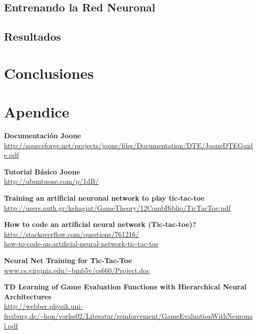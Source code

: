 \documentclass[12pt,titlepage]{article}
\begin{document}
\subsection{Entrenando la Red Neuronal}

\subsection{Resultados}

\section{Conclusiones}


\appendix
\section{Apendice}



\begin{thebibliography}{99}
		\textbf{Documentaci\'on Joone} \\
		\url{http://sourceforge.net/projects/joone/files/Documentation/DTE/JooneDTEGuide.pdf}

		\textbf{Tutorial B\'asico Joone} \\
		\url{http://ubuntuone.com/p/1dB/}

		\textbf{Training an artificial neuronal network to play tic-tac-toe} \\
		\url{http://users.auth.gr/kehagiat/GameTheory/12CombBiblio/TicTacToe.pdf}

		\textbf{How to code an artificial neural network (Tic-tac-toe)?} \\
		\url{http://stackoverflow.com/questions/761216/} \\
		\url{how-to-code-an-artificial-neural-network-tic-tac-toe}

		\textbf{Neural Net Training for Tic-Tac-Toe} \\
		\url{www.cs.virginia.edu/~bmb5v/cs660/Project.doc}

		\textbf{TD Learning of Game Evaluation Functions with Hierarchical Neural Architectures} \\
		\url{http://webber.physik.uni-freiburg.de/~hon/vorlss02/Literatur/reinforcement/GameEvaluationWithNeuronal.pdf}

\end{thebibliography}


\end{document}
